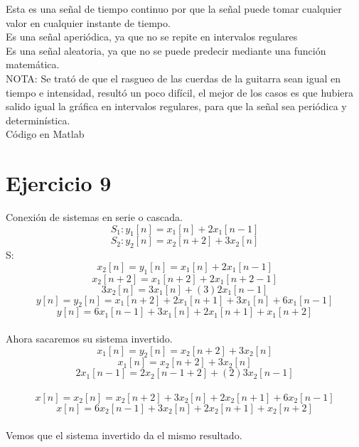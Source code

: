 \documentclass[10pt,a4paper]{report}
\begin{document}
\begin{enumerate}
Esta es una señal de tiempo continuo por que la señal puede tomar cualquier valor en cualquier instante de tiempo. \\
Es una señal aperiódica, ya que no se repite en intervalos regulares \\
Es una señal aleatoria, ya que no se puede predecir mediante una función matemática.\\
NOTA: Se trató de que el rasgueo de las cuerdas de la guitarra sean igual en tiempo e intensidad, resultó un poco difícil, el mejor de los casos es que hubiera salido igual la gráfica en intervalos regulares, para que la señal sea periódica y determinística.\\
\newline Código en Matlab
    

\end{enumerate}

\section{Ejercicio 9}

Conexión de sistemas en serie o cascada.\\
\[ S_{1}: y_{1}\left[ n \right]=x_{1}\left[ n \right]+2x_{1}\left[ n-1 \right] \]
\[ S_{2}: y_{2}\left[ n \right]=x_{2}\left[ n+2 \right]+3x_{2}\left[ n \right] \]
S:
\[ x_{2}\left[ n \right]=y_{1}\left[ n \right]=x_{1}\left[ n \right]+2x_{1}\left[ n-1 \right] \]
\[ x_{2}\left[ n+2 \right]=x_{1}\left[ n+2 \right]+2x_{1}\left[ n+2-1 \right] \]
\[ 3x_{2}\left[ n \right]=3x_{1}\left[ n \right]+(3)2x_{1}\left[ n-1 \right] \]
\[ y\left[ n \right]=y_{2}\left[ n \right]=x_{1}\left[ n+2 \right]+2x_{1}\left[ n+1 \right]+3x_{1}\left[ n \right]+6x_{1}\left[ n-1 \right] \]
\[ y\left[ n \right]=6x_{1}\left[ n-1 \right]+3x_{1}\left[ n \right]+2x_{1}\left[ n+1 \right]+x_{1}\left[ n+2 \right] \]\\
Ahora sacaremos su sistema invertido.\\
\[ x_{1}\left[ n \right]=y_{2}\left[ n \right]=x_{2}\left[ n+2 \right]+3x_{2}\left[ n \right] \]
\[ x_{1}\left[ n \right]=x_{2}\left[ n+2 \right]+3x_{2}\left[ n \right] \]
\[ 2x_{1}\left[ n-1 \right]=2x_{2}\left[ n-1+2 \right]+(2)3x_{2}\left[ n-1 \right] \]\\
\[ x\left[ n \right]=x_{2}\left[ n \right]=x_{2}\left[ n+2 \right]+3x_{2}\left[ n \right]+2x_{2}\left[ n+1 \right]+6x_{2}\left[ n-1 \right] \]
\[ x\left[ n \right]=6x_{2}\left[ n-1 \right]+3x_{2}\left[ n \right]+2x_{2}\left[ n+1 \right]+x_{2}\left[ n+2 \right] \]\\
Vemos que el sistema invertido da el mismo resultado.
\end{document}
